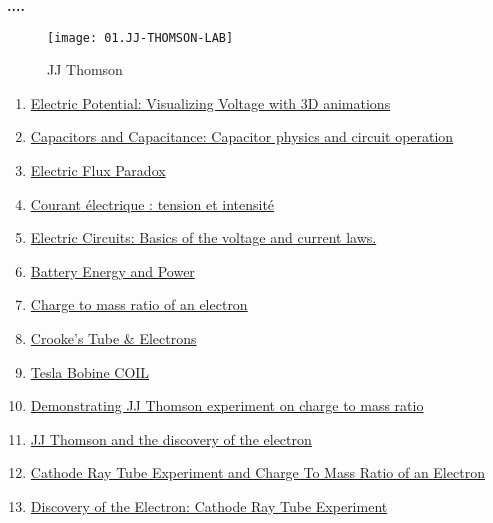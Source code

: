 \documentclass[../main.tex]{subfiles}
\begin{document}
\textbf{....}
        \begin{figure}[bh]
        \centering
        \texttt{[image: 01.JJ-THOMSON-LAB]}
        \label{fig:img1}
        \caption{JJ Thomson}
    \end{figure}
   
\begin{enumerate}[1. ] 
    \item \href{h https://www.youtube.com/watch?v=-Rb9guSEeVE&list=PLkyBCj4JhHt8DFH9QysGWm4h_DOxT93fb}{Electric Potential: Visualizing Voltage with 3D animations}
    \item \href{https://www.youtube.com/watch?v=f_MZNsEqyQw&list=PLkyBCj4JhHt8DFH9QysGWm4h_DOxT93fb&index=16}{Capacitors and Capacitance: Capacitor physics and circuit operation}
     \item \href{https://www.youtube.com/watch?v=P0Jnx1BjIZM&list=PLkyBCj4JhHt8DFH9QysGWm4h_DOxT93fb&index=29}{Electric Flux Paradox}
     \item \href{https://www.youtube.com/watch?v=eMTuPhg-8Go&t=22s}{Courant électrique : tension et intensité}
     \item \href{https://www.youtube.com/watch?v=m4jzgqZu-4s}{Electric Circuits: Basics of the voltage and current laws.}
     \item \href{https://www.youtube.com/watch?v=u4FpbaMW5sk}{Battery Energy and Power}
      \item \href{https://www.youtube.com/watch?v=5YYVnHN7xwM}{Charge to mass ratio of an electron}
      \item \href{https://www.youtube.com/watch?v=Ka3v5dIQGOI}{Crooke's Tube & Electrons}
       \item \href{https://fr.wikipedia.org/wiki/Bobine_Tesla}{Tesla Bobine COIL}
      \item \href{https://www.youtube.com/watch?v=QuLtuM8bAMI}{Demonstrating JJ Thomson experiment on charge to mass ratio}
      \item \href{https://www.youtube.com/watch?v=GR9A7Hd4mxQ}{JJ Thomson and the discovery of the electron}
      \item \href{https://www.youtube.com/watch?v=i6zyPOSreCg}{Cathode Ray Tube Experiment and Charge To Mass Ratio of an Electron}
    \item \href{https://www.youtube.com/watch?v=Rb6MguN0Uj4}{Discovery of the Electron: Cathode Ray Tube Experiment}


\end{enumerate}
\end{document}
